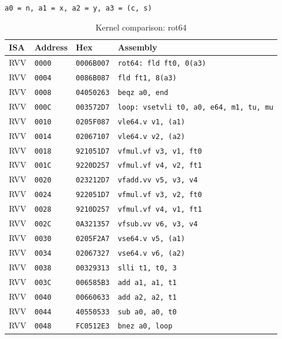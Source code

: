 \begin{table}[htbp]
\centering
\caption{Kernel comparison: rot64}
\begingroup
\scriptsize
\setlength{\tabcolsep}{4pt}
\noindent \texttt{a0 = n, a1 = x, a2 = y, a3 = (c, s)}\par
\vspace{0.6ex}
\begin{tabular}{@{}l|l|l|p{7.2cm}@{}}
\toprule
ISA & Address & Hex & Assembly \\
\midrule
RVV & \texttt{0000} & \texttt{0006B007} & \texttt{rot64: fld ft0, 0(a3)} \\
RVV & \texttt{0004} & \texttt{0086B087} & \texttt{fld ft1, 8(a3)} \\
RVV & \texttt{0008} & \texttt{04050263} & \texttt{beqz a0, end} \\
RVV & \texttt{000C} & \texttt{003572D7} & \texttt{loop: vsetvli t0, a0, e64, m1, tu, mu} \\
RVV & \texttt{0010} & \texttt{0205F087} & \texttt{vle64.v v1, (a1)} \\
RVV & \texttt{0014} & \texttt{02067107} & \texttt{vle64.v v2, (a2)} \\
RVV & \texttt{0018} & \texttt{921051D7} & \texttt{vfmul.vf v3, v1, ft0} \\
RVV & \texttt{001C} & \texttt{9220D257} & \texttt{vfmul.vf v4, v2, ft1} \\
RVV & \texttt{0020} & \texttt{023212D7} & \texttt{vfadd.vv v5, v3, v4} \\
RVV & \texttt{0024} & \texttt{922051D7} & \texttt{vfmul.vf v3, v2, ft0} \\
RVV & \texttt{0028} & \texttt{9210D257} & \texttt{vfmul.vf v4, v1, ft1} \\
RVV & \texttt{002C} & \texttt{0A321357} & \texttt{vfsub.vv v6, v3, v4} \\
RVV & \texttt{0030} & \texttt{0205F2A7} & \texttt{vse64.v v5, (a1)} \\
RVV & \texttt{0034} & \texttt{02067327} & \texttt{vse64.v v6, (a2)} \\
RVV & \texttt{0038} & \texttt{00329313} & \texttt{slli t1, t0, 3} \\
RVV & \texttt{003C} & \texttt{006585B3} & \texttt{add a1, a1, t1} \\
RVV & \texttt{0040} & \texttt{00660633} & \texttt{add a2, a2, t1} \\
RVV & \texttt{0044} & \texttt{40550533} & \texttt{sub a0, a0, t0} \\
RVV & \texttt{0048} & \texttt{FC0512E3} & \texttt{bnez a0, loop} \\

\end{tabular}
\end{table}
